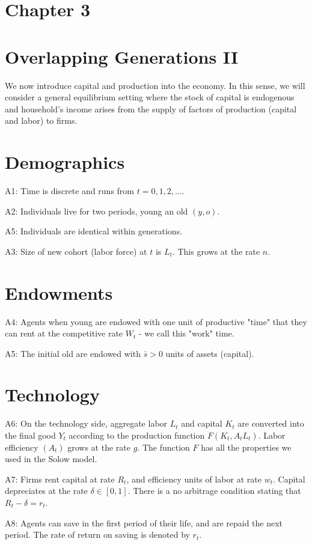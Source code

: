 \documentclass[10pt]{article}
\begin{document}
\captionsetup{singlelinecheck=false}
\section*{Chapter 3}
\section*{Overlapping Generations II}
We now introduce capital and production into the economy. In this sense, we will consider a general equilibrium setting where the stock of capital is endogenous and household's income arises from the supply of factors of production (capital and labor) to firms.

\section*{Demographics}
A1: Time is discrete and runs from $t=0,1,2, \ldots$.

A2: Individuals live for two periods, young an old $(y, o)$.

A5: Individuals are identical within generations.

A3: Size of new cohort (labor force) at $t$ is $L_{t}$. This grows at the rate $n$.

\section*{Endowments}
A4: Agents when young are endowed with one unit of productive "time" that they can rent at the competitive rate $W_{t}$ - we call this "work" time.

A5: The initial old are endowed with $\bar{s}>0$ units of assets (capital).

\section*{Technology}
A6: On the technology side, aggregate labor $L_{t}$ and capital $K_{t}$ are converted into the final good $Y_{t}$ according to the production function $F\left(K_{t}, A_{t} L_{t}\right)$. Labor efficiency $\left(A_{t}\right)$ grows at the rate $g$. The function $F$ has all the properties we used in the Solow model.

A7: Firms rent capital at rate $R_{t}$, and efficiency units of labor at rate $w_{t}$. Capital depreciates at the rate $\delta \in[0,1]$. There is a no arbitrage condition stating that $R_{t}-\delta=r_{t}$.

A8: Agents can save in the first period of their life, and are repaid the next period. The rate of return on saving is denoted by $r_{t}$.
\end{document}
